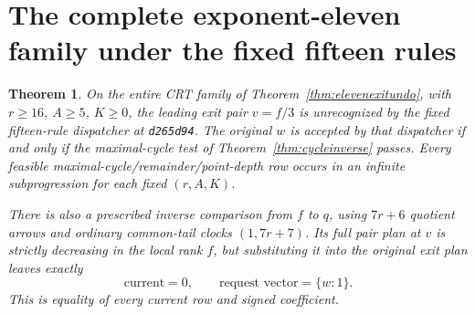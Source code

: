 \documentclass[11pt]{article}
\newtheorem{theorem}{Theorem}
\begin{document}
\section{The complete exponent-eleven family under the fixed fifteen rules}
\begin{theorem}\label{thm:refinedeleven}
On the entire CRT family of Theorem~\ref{thm:elevenexitundo}, with
$r\ge16$, $A\ge5$, $K\ge0$, the leading exit pair $v=f/3$ is
unrecognized by the fixed fifteen-rule dispatcher at
\texttt{d265d94}. The original $w$ is accepted by that dispatcher if
and only if the maximal-cycle test of Theorem~\ref{thm:cycleinverse}
passes. Every feasible maximal-cycle/remainder/point-depth row occurs
in an infinite subprogression for each fixed $(r,A,K)$.

There is also a prescribed inverse comparison from $f$ to $q$, using
$7r+6$ quotient arrows and ordinary common-tail clocks $(1,7r+7)$.
Its full pair plan at $v$ is strictly decreasing in the local rank $f$,
but substituting it into the original exit plan leaves exactly
\[
 \text{current}=0,\qquad \text{request vector}=\{w:1\}.
\]
This is equality of every current row and signed coefficient.
\end{theorem}
\end{document}
